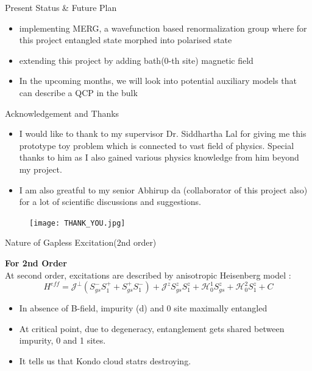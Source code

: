 \documentclass{beamer}
\begin{document}
\begin{frame}{Present Status \& Future Plan}
\begin{itemize}
\item implementing MERG, a wavefunction based renormalization group where for this project entangled state morphed into polarised state 
\item extending this project by adding bath($0$-th site) magnetic  field
\item In the upcoming months, we will look into potential auxiliary models that can describe a  QCP in the bulk
\end{itemize}
\end{frame}

\begin{frame}{Acknowledgement and Thanks}
\begin{itemize}
\item I would like to thank to my supervisor Dr. Siddhartha Lal for giving me this prototype toy problem which is connected to vast field of physics. Special thanks to him as I also gained various physics knowledge from him beyond my project.
\item I am also greatful to my senior Abhirup da (collaborator of this project also) for a lot of scientific discussions and suggestions.
\end{itemize}

\begin{figure}[!ht]
    \flushright
    \texttt{[image: THANK\_YOU.jpg]}
\end{figure}
\end{frame}




\appendix
\begin{frame}
\end{frame}


\begin{frame}{Nature of Gapless Excitation(2nd order)}

\textbf{For 2nd Order}\\
At second order, excitations are described by anisotropic Heisenberg model :
\begin{equation*}
H^{eff} = \mathcal{J}^{\perp} (S_{gs}^- S_1^+ + S_{gs}^+ S_1^-) + \mathcal{J}^z S_{gs}^z S_1^z +    \mathcal{H}_0^1 S_{gs}^z + \mathcal{H}_0^2 S_1^z + C 
\end{equation*}
\begin{itemize}
\item In absence of B-field, impurity (d) and 0 site maximally entangled
\item At critical point, due to degeneracy, entanglement gets shared between impurity, 0 and 1 sites.
\item It tells us that Kondo cloud statrs destroying.
\end{itemize}
\end{frame}
\end{document}
